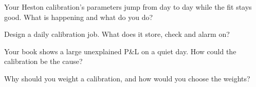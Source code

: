 \begin{interviewq}\label{iq:dv:fourier-pricing-and-calibration-engineering:3}
Your Heston calibration's parameters jump from day to day while the fit stays good. What is happening and what do you do?
\end{interviewq}

\begin{interviewq}\label{iq:dv:fourier-pricing-and-calibration-engineering:4}
Design a daily calibration job. What does it store, check and alarm on?
\end{interviewq}

\begin{interviewq}\label{iq:dv:fourier-pricing-and-calibration-engineering:5}
Your book shows a large unexplained P\&L on a quiet day. How could the calibration be the cause?
\end{interviewq}

\begin{interviewq}\label{iq:dv:fourier-pricing-and-calibration-engineering:6}
Why should you weight a calibration, and how would you choose the weights?
\end{interviewq}
